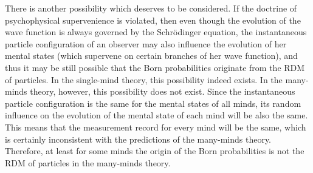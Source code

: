 There is another possibility which deserves to be considered. 
If the doctrine of psychophysical supervenience is violated, then even though the evolution of the wave function is always governed by the Schr\"{o}dinger equation,  the instantaneous particle configuration of an observer may also influence the evolution of her mental states (which supervene on certain branches of her wave function), and thus it may be still possible that the Born probabilities originate from the RDM of particles.
In the single-mind theory, this possibility indeed exists.
In the many-minds theory, however, this possibility does not exist.
Since  the instantaneous particle configuration is the same for the mental states of all minds, its random influence on the evolution of the mental state of each mind will be also the same. 
This means that the measurement record for every mind will be the same, which is certainly inconsistent with the predictions of the many-minds theory.
Therefore, at least for some minds the origin of the Born probabilities is not the RDM of particles in the many-minds theory.



